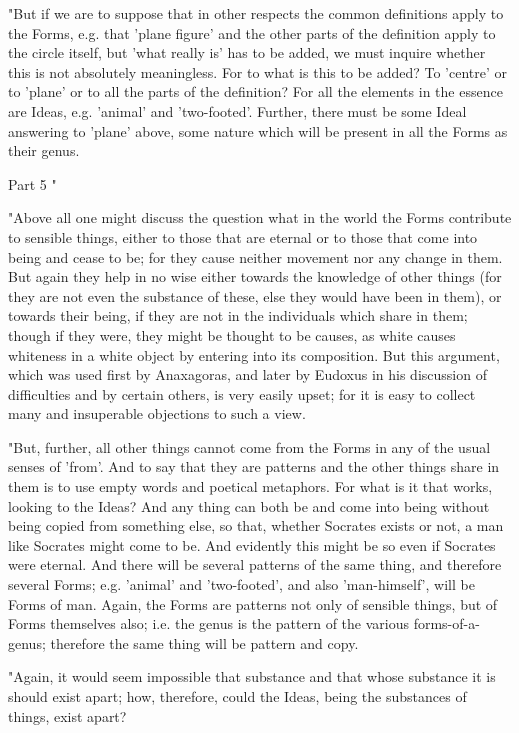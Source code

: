 "But if we are to suppose that in other respects the common definitions
apply to the Forms, e.g. that 'plane figure' and the other parts of
the definition apply to the circle itself, but 'what really is' has
to be added, we must inquire whether this is not absolutely meaningless.
For to what is this to be added? To 'centre' or to 'plane' or to all
the parts of the definition? For all the elements in the essence are
Ideas, e.g. 'animal' and 'two-footed'. Further, there must be some
Ideal answering to 'plane' above, some nature which will be present
in all the Forms as their genus. 

Part 5 "

"Above all one might discuss the question what in the world the Forms
contribute to sensible things, either to those that are eternal or
to those that come into being and cease to be; for they cause neither
movement nor any change in them. But again they help in no wise either
towards the knowledge of other things (for they are not even the substance
of these, else they would have been in them), or towards their being,
if they are not in the individuals which share in them; though if
they were, they might be thought to be causes, as white causes whiteness
in a white object by entering into its composition. But this argument,
which was used first by Anaxagoras, and later by Eudoxus in his discussion
of difficulties and by certain others, is very easily upset; for it
is easy to collect many and insuperable objections to such a view.

"But, further, all other things cannot come from the Forms in any
of the usual senses of 'from'. And to say that they are patterns and
the other things share in them is to use empty words and poetical
metaphors. For what is it that works, looking to the Ideas? And any
thing can both be and come into being without being copied from something
else, so that, whether Socrates exists or not, a man like Socrates
might come to be. And evidently this might be so even if Socrates
were eternal. And there will be several patterns of the same thing,
and therefore several Forms; e.g. 'animal' and 'two-footed', and also
'man-himself', will be Forms of man. Again, the Forms are patterns
not only of sensible things, but of Forms themselves also; i.e. the
genus is the pattern of the various forms-of-a-genus; therefore the
same thing will be pattern and copy. 

"Again, it would seem impossible that substance and that whose substance
it is should exist apart; how, therefore, could the Ideas, being the
substances of things, exist apart? 

